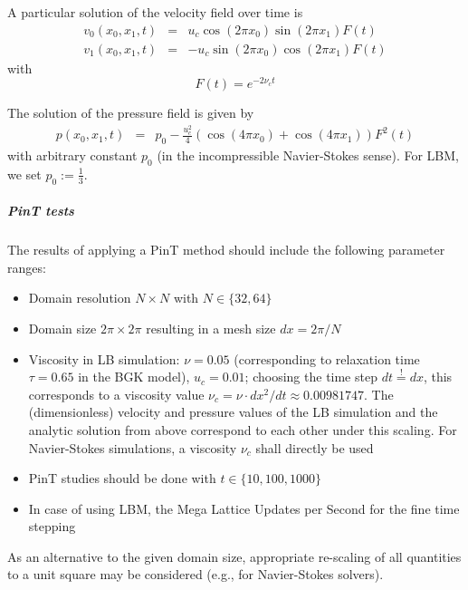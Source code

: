 A particular solution of the velocity field over time is
\begin{eqnarray}
	v_0(x_0,x_1,t) &=& u_c\cos \left(2\pi x_0\right) \sin \left(2\pi x_1\right) F(t)\\
	v_1(x_0,x_1,t) &=& -u_c\sin \left(2\pi x_0\right) \cos \left(2\pi x_1\right) F(t)
\end{eqnarray}
with
$$
	F(t) = e^{-2\nu_c t}
$$

The solution of the pressure field is given by
\begin{eqnarray}
	p(x_0,x_1,t) &=& p_0-\frac{u_c^2}{4} \left( \cos \left(4\pi x_0\right) + \cos \left(4\pi x_1\right) \right) F^2(t)
\end{eqnarray}
with arbitrary constant $p_0$ (in the incompressible Navier-Stokes sense).
For LBM, we set $p_0:=\frac{1}{3}$.


\subparagraph{PinT tests}

The results of applying a PinT method should include the following parameter ranges:

\begin{itemize}
	\item Domain resolution $N\times N$ with $N \in \{ 32, 64\}$
	\item Domain size $2\pi\times 2\pi$ resulting in a mesh size $dx=2\pi/N$
	\item Viscosity in LB simulation: $\nu = 0.05$ (corresponding to relaxation time $\tau=0.65$ in the BGK model), $u_c = 0.01$; choosing the time step $dt\stackrel{!}{=}dx$, this corresponds to a viscosity value $\nu_c=\nu\cdot dx^2/dt \approx 0.00981747$. The (dimensionless) velocity and pressure values of the LB simulation and the analytic solution from above correspond to each other under this scaling. For Navier-Stokes simulations, a viscosity $\nu_c$ shall directly be used
	\item PinT studies should be done with $t \in \{ 10, 100, 1000 \}$
	\item In case of using LBM, the Mega Lattice Updates per Second for the fine time stepping
\end{itemize}
As an alternative to the given domain size, appropriate re-scaling of all quantities to a unit square may be considered (e.g., for Navier-Stokes solvers).

